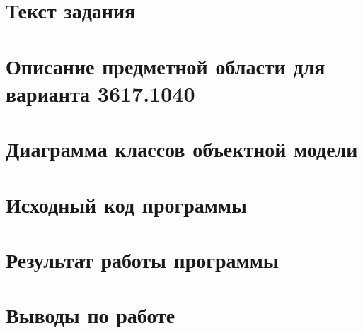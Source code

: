 \documentclass[a4paper, 11pt]{article}
\begin{document}


\tableofcontents
\vspace{2em}
\pagebreak{}

\section{Текст задания}

\pagebreak

\section{Описание предметной области для варианта 3617.1040}

\pagebreak

\section{Диаграмма классов объектной модели}

\pagebreak

\section{Исходный код программы}


\section{Результат работы программы}

\section{Выводы по работе}

\end{document}
